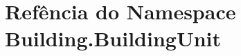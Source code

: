 \hypertarget{namespaceBuilding_1_1BuildingUnit}{\section{Refência do Namespace Building.\-Building\-Unit}
\label{namespaceBuilding_1_1BuildingUnit}
}

